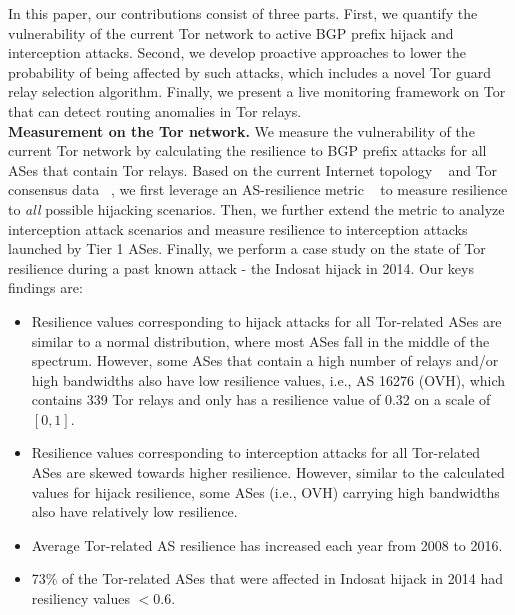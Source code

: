 In this paper, our contributions consist of three parts. First, we quantify the vulnerability of the current Tor network to active BGP prefix hijack and interception attacks. Second, we develop proactive approaches to lower the probability of being affected by such attacks, which includes a novel Tor guard relay selection algorithm. Finally, we present a live monitoring framework on Tor that can detect routing anomalies in Tor relays. 
\\
\textbf{Measurement on the Tor network.} We measure the vulnerability of the current Tor network by calculating the resilience to BGP prefix attacks for all ASes that contain Tor relays. Based on the current Internet topology ~\cite{topology} and Tor consensus data ~\cite{torconsensus}, we first leverage an AS-resilience metric ~\cite{lad2007understanding} to measure resilience to \emph{all} possible hijacking scenarios. Then, we further extend the metric to analyze interception attack scenarios and measure resilience to interception attacks launched by Tier 1 ASes. Finally, we perform a case study on the state of Tor resilience during a past known attack - the Indosat hijack in 2014. Our keys findings are:
\begin{itemize}
\item Resilience values corresponding to hijack attacks for all Tor-related ASes are similar to a normal distribution, where most ASes fall in the middle of the spectrum. However, some ASes that contain a high number of relays and/or high bandwidths also have low resilience values, i.e., AS 16276 (OVH), which contains 339 Tor relays and only has a resilience value of 0.32 on a scale of $[0,1]$.
\item Resilience values corresponding to interception attacks for all Tor-related ASes are skewed towards higher resilience. However, similar to the calculated values for hijack resilience, some ASes (i.e., OVH) carrying high bandwidths also have relatively low resilience. 
\item Average Tor-related AS resilience has increased each year from 2008 to 2016. 
\item 73\% of the Tor-related ASes that were affected in Indosat hijack in 2014 had resiliency values $< 0.6$.
\end{itemize}
